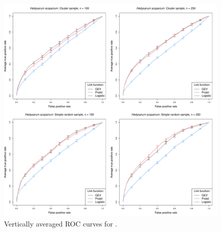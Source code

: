 \begin{figure}
	\includegraphics[width=\linewidth]{plots/data-perf-species2}
	\caption{Vertically averaged ROC curves for \hedysarum{}.}
	\label{rbfig:data2roc}
\end{figure}

